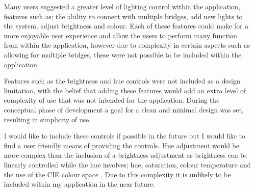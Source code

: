 Many users suggested a greater level of lighting control within the
application, features such as; the ability to connect with multiple
bridges, add new lights to the system, adjust brightness and colour.
Each of these features could make for a more enjoyable user experience
and allow the users to perform many function from within the
application, however due to complexity in certain aspects such as
allowing for multiple bridges, these were not possible to be included
within the application.

Features such as the brightness and hue controls were not included as a
design limitation, with the belief that adding these features would add
an extra level of complexity of use that was not intended for the
application. During the conceptual phase of development a goal for a
clean and minimal design was set, resulting in simplicity of use.

I would like to include these controls if possible in the future but I
would like to find a user friendly means of providing the controls. Hue
adjustment would be more complex than the inclusion of a brightness
adjustment as brightness can be linearly controlled while the hue
involves; hue, saturation, colour temperature and the use of the CIE
colour space \parencite{1475-4878-30-4-301}. Due to this complexity it
is unlikely to be included within my application in the near future.
